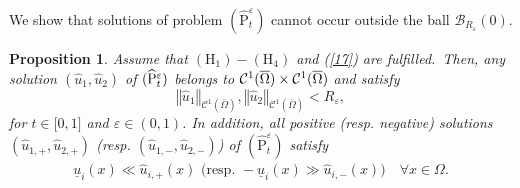 \documentclass[11pt]{amsart}
\newtheorem{proposition}{Proposition}[section]
\theoremstyle{definition}
\theoremstyle{remark}
\numberwithin{equation}{section}
\begin{document}
We show that solutions of problem $(\widehat{\mathrm{P}}_{t}^{\varepsilon })$
cannot occur outside the ball $\mathcal{B}_{R_{\varepsilon }}(0)$.

\begin{proposition}
\label{P3} Assume that $(\mathrm{H}_{1})-(\mathrm{H}_{4})$ and (\ref{17})
are fulfilled.\ Then, any solution $(\hat{u}_{1},\hat{u}_{2})$ of $(\widehat{%
\mathrm{P}}_{t}^{\varepsilon })$ belongs to $\mathcal{C}^{1}(\overline{%
\Omega })\times \mathcal{C}^{1}(\overline{\Omega })$ and satisfy 
\begin{equation}
\left\Vert \hat{u}_{1}\right\Vert _{\mathcal{C}^{1}(\overline{\Omega }%
)},\left\Vert \hat{u}_{2}\right\Vert _{\mathcal{C}^{1}(\overline{\Omega }%
)}<R_{\varepsilon },  \label{24}
\end{equation}%
for $t\in \lbrack 0,1]$ and $\varepsilon \in (0,1)$. In addition, all
positive (resp. negative) solutions $(\hat{u}_{1,+},\hat{u}_{2,+})$ (resp. $(%
\hat{u}_{1,-},\hat{u}_{2,-})$) of $(\widehat{\mathrm{P}}_{t}^{\varepsilon })$
satisfy 
\begin{equation}
\begin{array}{c}
\underline{u}_{i}(x)\ll \hat{u}_{i,+}(x)\text{ \ (resp. }-\underline{u}%
_{i}(x)\gg \hat{u}_{i,-}(x)\text{)}\quad \forall x\in \Omega .%
\end{array}
\label{25}
\end{equation}
\end{proposition}
\end{document}
